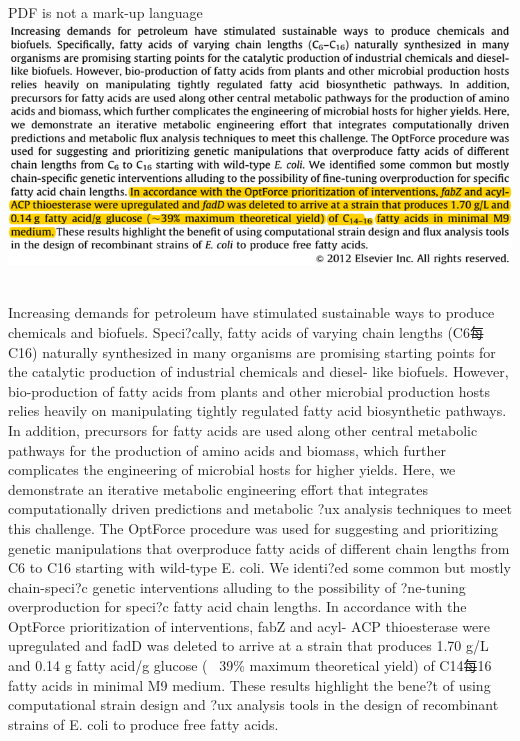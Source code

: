 \documentclass[11pt]{beamer}
\begin{document}
\begin{frame}{PDF is not a mark-up language} 
~
\includegraphics[width=.85\textwidth]{sample_PDF.png}
~

{\tiny Increasing demands for petroleum have stimulated sustainable ways to produce chemicals and  biofuels. Speci?cally, fatty acids of varying chain lengths (C6每C16) naturally synthesized in many organisms are promising starting points for the catalytic production of industrial chemicals and diesel- like biofuels. However, bio-production of fatty acids from plants and other microbial production hosts relies heavily on manipulating tightly regulated fatty acid biosynthetic pathways. In addition,  precursors for fatty acids are used along other central metabolic pathways for the production of amino acids and biomass, which further complicates the engineering of microbial hosts for higher yields. Here, we demonstrate an iterative metabolic engineering effort that integrates computationally driven predictions and metabolic ?ux analysis techniques to meet this challenge. The OptForce procedure was used for suggesting and prioritizing genetic manipulations that overproduce fatty acids of different  chain lengths from C6 to C16 starting with wild-type E. coli. We identi?ed some common but mostly chain-speci?c genetic interventions alluding to the possibility of ?ne-tuning overproduction for speci?c fatty acid chain lengths. In accordance with the OptForce prioritization of interventions, fabZ and acyl- ACP thioesterase were upregulated and fadD was deleted to arrive at a strain that produces 1.70 g/L and 0.14 g fatty acid/g glucose (~ 39\% maximum theoretical yield) of C14每16 fatty acids in minimal M9 medium. These results highlight the bene?t of using computational strain design and ?ux analysis tools in the design of recombinant strains of E.  coli  to produce free fatty   acids.}
\end{frame}
\end{document}

